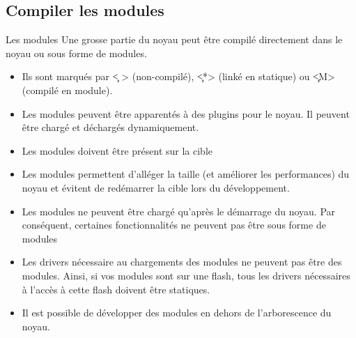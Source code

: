 \subsection{Compiler les modules}
\begin{frame}[fragile=singleslide]{Les modules}
  Une grosse  partie du  noyau peut être  compilé directement  dans le
  noyau ou sous forme de modules.
  \begin{itemize} 
  \item Ils sont marqués par  \c{< >} (non-compilé), \c{<*>} (linké en
    statique) ou \c{<M>} (compilé en module).
  \item  Les modules  peuvent être  apparentés à  des plugins  pour le
    noyau. Il peuvent être chargé et déchargés dynamiquement.
  \item Les modules doivent être présent sur la cible
  \item Les  modules permettent d'alléger la taille  (et améliorer les
    performances) du noyau  et évitent de redémarrer la  cible lors du
    développement.
  \item Les  modules ne peuvent  être chargé qu'après le  démarrage du
    noyau.  Par conséquent, certaines  fonctionnalités ne  peuvent pas
    être sous forme de modules
  \item Les  drivers nécessaire au chargements des  modules ne peuvent
    pas être  des modules. Ainsi, si  vos modules sont  sur une flash,
    tous les drivers nécessaires à  l'accès à cette flash doivent être
    statiques.
  \item  Il  est possible  de  développer  des  modules en  dehors  de
    l'arborescence du noyau.
  \end{itemize}
\end{frame}


